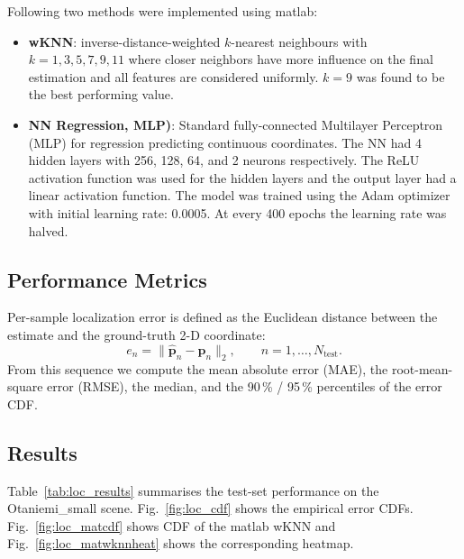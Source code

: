 Following two methods were implemented using matlab:
\begin{itemize}
 \item \textbf{wKNN}: inverse-distance-weighted $k$-nearest
        neighbours with $k=1,3, 5, 7, 9, 11$ where closer neighbors have more influence 
        on the final estimation and all features are considered uniformly. 
        $k=9$ was found to be the best performing value.  
\item \textbf{NN Regression, MLP)}: Standard fully-connected Multilayer Perceptron (MLP) 
for regression predicting continuous coordinates. The NN had 4 hidden layers with  
256, 128, 64, and 2 neurons respectively. The ReLU activation function was used 
for the hidden layers and the output layer had a linear activation function. 
The model was trained using the Adam optimizer with initial learning rate: 0.0005. At every 400 epochs the learning rate 
 was halved. 

\end{itemize}


\subsection{Performance Metrics}

Per-sample localization error is defined as the Euclidean distance
between the estimate and the ground-truth 2-D coordinate:
\begin{equation}
  e_n = \bigl\lVert \hat{\mathbf{p}}_n - \mathbf{p}_n \bigr\rVert_2,
  \qquad n = 1,\dots,N_{\mathrm{test}}.
\end{equation}
From this sequence we compute the mean absolute error (MAE), the
root-mean-square error (RMSE), the median, and the 90\,\% / 95\,\%
percentiles of the error CDF.

\subsection{Results}

Table~\ref{tab:loc_results} summarises the test-set performance on the
Otaniemi\_small scene. Fig.~\ref{fig:loc_cdf}  shows the empirical
error CDFs. Fig.~\ref{fig:loc_matcdf} shows CDF of the matlab wKNN 
and Fig.~\ref{fig:loc_matwknnheat} shows the corresponding heatmap.  



